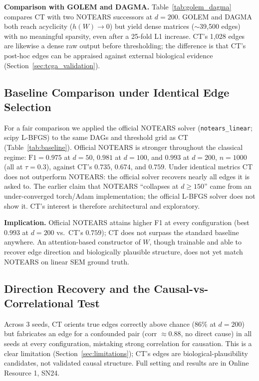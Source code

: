 \documentclass[12pt,a4paper]{article}
\begin{document}
\textbf{Comparison with GOLEM and DAGMA.} Table~\ref{tab:golem_dagma} compares CT with two NOTEARS successors at $d=200$. GOLEM \cite{ng2020golem} and DAGMA \cite{bello2022dagma} both reach acyclicity ($h(W)\to 0$) but yield dense matrices ($\sim$39,500 edges) with no meaningful sparsity, even after a 25-fold L1 increase. CT's 1,028 edges are likewise a dense raw output before thresholding; the difference is that CT's post-hoc edges can be appraised against external biological evidence (Section~\ref{sec:tcga_validation}).

\subsection{Baseline Comparison under Identical Edge Selection}
\label{sec:baseline_metrics}

For a fair comparison we applied the official NOTEARS solver (\texttt{notears\_linear}; scipy L-BFGS) to the same DAGs and threshold grid as CT (Table~\ref{tab:baseline}). Official NOTEARS is stronger throughout the classical regime: $\mathrm{F1}=0.975$ at $d=50$, $0.981$ at $d=100$, and $0.993$ at $d=200$, $n=1000$ (all at $\tau=0.3$), against CT's $0.735$, $0.674$, and $0.759$. Under identical metrics CT does not outperform NOTEARS: the official solver recovers nearly all edges it is asked to. The earlier claim that NOTEARS ``collapses at $d\ge150$'' came from an under-converged torch/Adam implementation; the official L-BFGS solver does not show it. CT's interest is therefore architectural and exploratory.

\textbf{Implication.} Official NOTEARS attains higher F1 at every configuration (best $0.993$ at $d=200$ vs.\ CT's $0.759$); CT does not surpass the standard baseline anywhere. An attention-based constructor of $W$, though trainable and able to recover edge direction and biologically plausible structure, does not yet match NOTEARS on linear SEM ground truth.

\subsection{Direction Recovery and the Causal-vs-Correlational Test}
\label{sec:directional}

Across 3 seeds, CT orients true edges correctly above chance ($86\%$ at $d=200$) but fabricates an edge for a confounded pair (corr $\approx 0.88$, no direct cause) in all seeds at every configuration, mistaking strong correlation for causation. This is a clear limitation (Section~\ref{sec:limitations}); CT's edges are biological-plausibility candidates, not validated causal structure. Full setting and results are in Online Resource 1, SN24.
\end{document}
